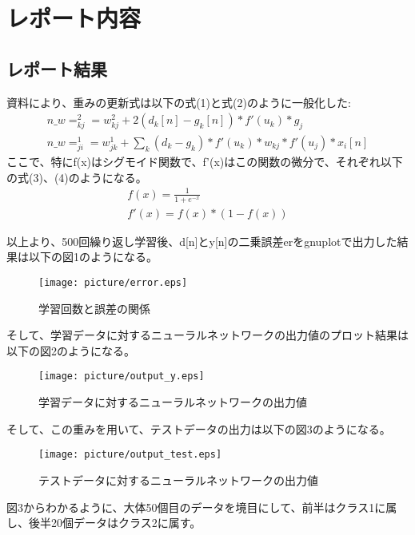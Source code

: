 \documentclass[a4j,12]{jarticle}
\begin{document}
\section{レポート内容}
\subsection{レポート結果}
資料により、重みの更新式は以下の式(1)と式(2)のように一般化した:
\begin{eqnarray} 
  n\_w=^2_{kj}=w^2_{kj}+2(d_k[n]-g_k[n])*f'(u_k)*g_j\\
  n\_w=^1_{ji}=w^1_{jk}+{\sum_k(d_k-g_k)*f'(u_k)*w_{kj}}*f'(u_j)*x_i[n]
\end{eqnarray}%
ここで、特にf(x)はシグモイド関数で、f'(x)はこの関数の微分で、それぞれ以下の式(3)、(4)のようになる。
\begin{eqnarray}
  f(x)=\frac{1}{1+e^{-x}}\\
  f'(x)=f(x)*(1-f(x))
\end{eqnarray}

以上より、500回繰り返し学習後、d[n]とy[n]の二乗誤差erをgnuplotで出力した結果は以下の図1のようになる。
\begin{figure}[htpb]
  \begin{center}
    \texttt{[image: picture/error.eps]}
    \caption{学習回数と誤差の関係}
    \label{micon}
  \end{center}
\end{figure}
そして、学習データに対するニューラルネットワークの出力値のプロット結果は以下の図2のようになる。
\begin{figure}[htpb]
  \begin{center}
    \texttt{[image: picture/output\_y.eps]}
    \caption{学習データに対するニューラルネットワークの出力値}
    \label{micon}
  \end{center}
\end{figure}
そして、この重みを用いて、テストデータの出力は以下の図3のようになる。
\begin{figure}[htpb]
  \begin{center}
    \texttt{[image: picture/output\_test.eps]}
    \caption{テストデータに対するニューラルネットワークの出力値}
    \label{micon}
  \end{center}
\end{figure}
図3からわかるように、大体50個目のデータを境目にして、前半はクラス1に属し、後半20個データはクラス2に属す。
\end{document}
